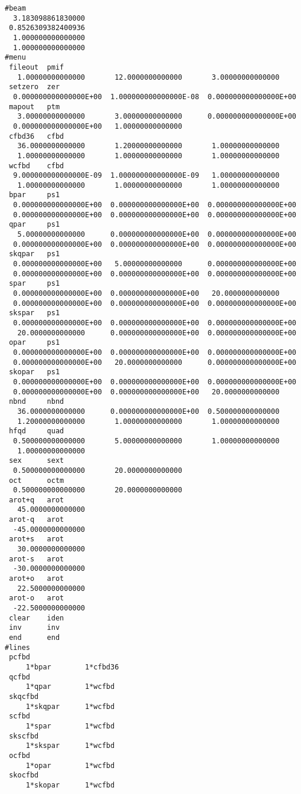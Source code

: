 \begin{footnotesize}
\begin{verbatim}
#beam
  3.183098861830000
 0.8526309382400936
  1.000000000000000
  1.000000000000000
#menu
 fileout  pmif
   1.00000000000000       12.0000000000000       3.00000000000000
 setzero  zer
  0.000000000000000E+00  1.000000000000000E-08  0.000000000000000E+00
 mapout   ptm
   3.00000000000000       3.00000000000000      0.000000000000000E+00
  0.000000000000000E+00   1.00000000000000
 cfbd36   cfbd
   36.0000000000000       1.20000000000000       1.00000000000000
   1.00000000000000       1.00000000000000       1.00000000000000
 wcfbd    cfbd
  9.000000000000000E-09  1.000000000000000E-09   1.00000000000000
   1.00000000000000       1.00000000000000       1.00000000000000
 bpar     ps1
  0.000000000000000E+00  0.000000000000000E+00  0.000000000000000E+00
  0.000000000000000E+00  0.000000000000000E+00  0.000000000000000E+00
 qpar     ps1
   5.00000000000000      0.000000000000000E+00  0.000000000000000E+00
  0.000000000000000E+00  0.000000000000000E+00  0.000000000000000E+00
 skqpar   ps1
  0.000000000000000E+00   5.00000000000000      0.000000000000000E+00
  0.000000000000000E+00  0.000000000000000E+00  0.000000000000000E+00
 spar     ps1
  0.000000000000000E+00  0.000000000000000E+00   20.0000000000000
  0.000000000000000E+00  0.000000000000000E+00  0.000000000000000E+00
 skspar   ps1
  0.000000000000000E+00  0.000000000000000E+00  0.000000000000000E+00
   20.0000000000000      0.000000000000000E+00  0.000000000000000E+00
 opar     ps1
  0.000000000000000E+00  0.000000000000000E+00  0.000000000000000E+00
  0.000000000000000E+00   20.0000000000000      0.000000000000000E+00
 skopar   ps1
  0.000000000000000E+00  0.000000000000000E+00  0.000000000000000E+00
  0.000000000000000E+00  0.000000000000000E+00   20.0000000000000
 nbnd     nbnd
   36.0000000000000      0.000000000000000E+00  0.500000000000000
   1.20000000000000       1.00000000000000       1.00000000000000
 hfqd     quad
  0.500000000000000       5.00000000000000       1.00000000000000
   1.00000000000000
 sex      sext
  0.500000000000000       20.0000000000000
 oct      octm
  0.500000000000000       20.0000000000000
 arot+q   arot
   45.0000000000000
 arot-q   arot
  -45.0000000000000
 arot+s   arot
   30.0000000000000
 arot-s   arot
  -30.0000000000000
 arot+o   arot
   22.5000000000000
 arot-o   arot
  -22.5000000000000
 clear    iden
 inv      inv
 end      end
#lines
 pcfbd
     1*bpar        1*cfbd36
 qcfbd
     1*qpar        1*wcfbd
 skqcfbd
     1*skqpar      1*wcfbd
 scfbd
     1*spar        1*wcfbd
 skscfbd
     1*skspar      1*wcfbd
 ocfbd
     1*opar        1*wcfbd
 skocfbd
     1*skopar      1*wcfbd

\end{verbatim}
\end{footnotesize}
